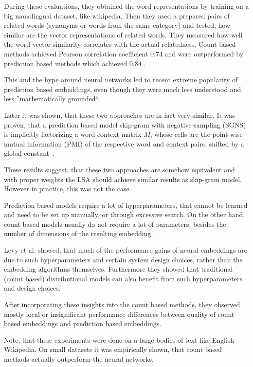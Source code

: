     During these evaluations, they obtained the word representations by training on a big monolingual dataset, like wikipedia.
    Then they used a prepared pairs of related words (synonyms or words from the same category) and tested,
    how similar are the vector representations of related words. 
    They measured how well the word vector similarity correlates with the actual relatedness. 
    Count based methods achieved Pearson correlation coefficient $0.74$ and were outperformed by prediction based methods which achieved $0.84$ \cite{baroni2014don}.
    
    This and the hype around neural networks led to recent extreme popularity of prediction based embeddings,
    even though they were much less understood and less ''mathematically grounded``.
    
    Later it was shown, that these two approaches are in fact very similar.
    It was proven, that a prediction based model skip-gram with negative-sampling (SGNS) 
    is implicitly factorizing a word-context matrix $M$,
    whose cells are the point-wise mutual information (PMI) of the respective word and context pairs, 
    shifted by a global constant~\cite{levy2014neural}. %
    
    These results suggest, that these two approaches are somehow equivalent and with proper weights the LSA should achieve similar results as skip-gram model. 
    However in practice, this was not the case.
    
    Prediction based models require a lot of hyperparameters, that cannot be learned and need to be set up manually,
    or through excessive search.
    On the other hand, count based models usually do not require a lot of parameters, besides the number of dimensions of the resulting embedding. 
    
    Levy et al. \cite{levy2015improving} %
    showed, that much  of  the  performance  gains  of  neural embeddings  are  due  to such hyperparameters and certain system design choices, rather than the embedding algorithms themselves. 
    Furthermore they showed that traditional (count based) distributional models
    can also benefit from such hyperparameters and design choices.
    
    After incorporating these insights into the count based methods, 
    they observed mostly local or insignificant performance differences between quality of count based embeddings and prediction based embeddings.
    
    Note, that these experiments were done on a large bodies of text like English Wikipedia.   
    On small datasets it was empirically shown, that count based methods actually outperform the neural networks\cite{altszyler2016comparative}. %
    
    

